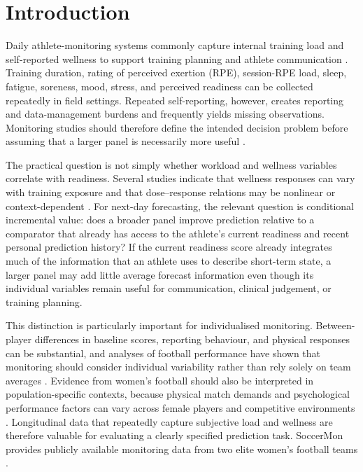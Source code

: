 \section{Introduction}
Daily athlete-monitoring systems commonly capture internal training load and self-reported wellness to support training planning and athlete communication \citep{Halson2014,Brink2010,Rago2020,Saw2016,Thorpe2015}. Training duration, rating of perceived exertion (RPE), session-RPE load, sleep, fatigue, soreness, mood, stress, and perceived readiness can be collected repeatedly in field settings. Repeated self-reporting, however, creates reporting and data-management burdens and frequently yields missing observations. Monitoring studies should therefore define the intended decision problem before assuming that a larger panel is necessarily more useful \citep{Saw2016,Midoglu2024}.

The practical question is not simply whether workload and wellness variables correlate with readiness. Several studies indicate that wellness responses can vary with training exposure and that dose--response relations may be nonlinear or context-dependent \citep{Campbell2020,Campbell2021}. For next-day forecasting, the relevant question is conditional incremental value: does a broader panel improve prediction relative to a comparator that already has access to the athlete's current readiness and recent personal prediction history? If the current readiness score already integrates much of the information that an athlete uses to describe short-term state, a larger panel may add little average forecast information even though its individual variables remain useful for communication, clinical judgement, or training planning.

This distinction is particularly important for individualised monitoring. Between-player differences in baseline scores, reporting behaviour, and physical responses can be substantial, and analyses of football performance have shown that monitoring should consider individual variability rather than rely solely on team averages \citep{OlivaLozano2021}. Evidence from women's football should also be interpreted in population-specific contexts, because physical match demands and psychological performance factors can vary across female players and competitive environments \citep{Baptista2022,Pettersen2022}. Longitudinal data that repeatedly capture subjective load and wellness are therefore valuable for evaluating a clearly specified prediction task. SoccerMon provides publicly available monitoring data from two elite women's football teams \citep{Midoglu2024,SoccerMonZenodo}.

